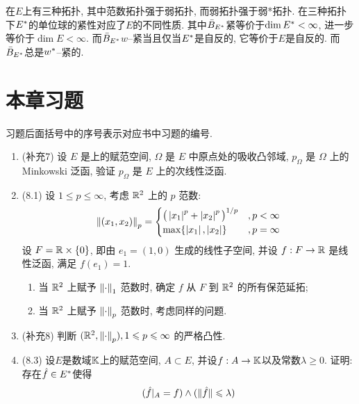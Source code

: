\begin{Remark}
	在$ E $上有三种拓扑, 其中范数拓扑强于弱拓扑, 而弱拓扑强于弱*拓扑. 在三种拓扑下$ E^{*} $的单位球的紧性对应了$ E $的不同性质. 其中$ \bar{B}_{E^{*}} $紧等价于$ \dim E^{*}<\infty $, 进一步等价于$ \dim E<\infty $. 而$ \bar{B}_{E^{*}} $$ w $--紧当且仅当$ E^{*} $是自反的, 它等价于$ E $是自反的. 而$ \bar{B}_{E^{*}} $总是$ w^{*} $--紧的.
\end{Remark}

\section*{本章习题}

习题后面括号中的序号表示对应书中习题的编号.

\begin{enumerate}[label=\textbf{\arabic*.}, ref=\arabic*]
	\item (补充7) 设 $ E $ 是\R 上的赋范空间, $ \varOmega $ 是 $ E $ 中原点处的吸收凸邻域, $ p_{\varOmega} $ 是 $ \varOmega $ 上的 Minkowski 泛函, 验证 $ p_{\varOmega} $ 是 $ E $ 上的次线性泛函.
	\item (8.1) 设 $ 1\leqslant p\leqslant\infty $, 考虑 $ \mathbb{R}^{2} $ 上的 $ p $ 范数:
	      \[
		      \left\| (x_{1}, x_{2}) \right\|_{p}=
		      \begin{cases}
			      \big( \left| x_{1} \right| ^{p}+\left| x_{2} \right| ^{p} \big)^{1/p} & ,p<\infty   \\
			      \max\{\left| x_{1} \right| , \left| x_{2} \right| \}                  & ,p = \infty
		      \end{cases}
	      \]
	      设 $ F=\mathbb{R}\times\{ 0 \} $, 即由 $ e_{1}=(1, 0) $ 生成的线性子空间, 并设 $ f:F\to\mathbb{R} $ 是线性泛函, 满足 $ f(e_{1})=1 $.
	      \begin{enumerate}[(1)]
		      \item 当 $ \mathbb{R}^{2} $ 上赋予 $ \left\| \cdot \right\|_{1} $ 范数时, 确定 $ f $ 从 $ F $ 到 $ \mathbb{R}^{2} $ 的所有保范延拓;
		      \item 当 $ \mathbb{R}^{2} $ 上赋予 $ \left\| \cdot \right\|_{p} $ 范数时, 考虑同样的问题.
	      \end{enumerate}
	\item (补充8) 判断 $ (\mathbb{R}^{2}, \left\| \cdot \right\|_{p}), 1\leqslant p\leqslant\infty $ 的严格凸性.
	\item (8.3) 设$ E $是数域$ \mathbb{K} $上的赋范空间, $ A\subset E $, 并设$ f : A\to\mathbb{K} $以及常数$ \lambda\geqslant 0 $. 证明: 存在$ \hat{f}\in E^{*} $使得
	      \[
		      (\hat{f}\rvert_A=f)\land (\lVert \hat{f}\rVert\leqslant\lambda)
	      \]

\end{enumerate}
